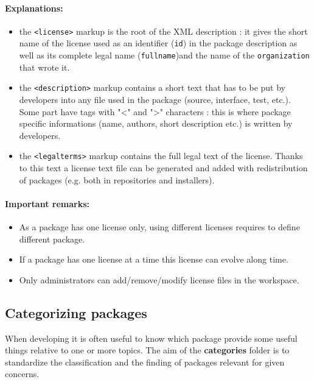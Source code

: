 \documentclass[12pt,a4paper]{article}
\begin{document}
\paragraph{Explanations:}
\begin{itemize}
\item the \texttt{<license>} markup is the root of the XML description : it gives the short name of the license used as an identifier (\texttt{id}) in the package description as well as its complete legal name (\texttt{fullname})and the name of the \texttt{organization} that wrote it.
\item the \texttt{<description>} markup contains a short text that has to be put by developers into any file used in the package (source, interface, test, etc.). Some part have tags with "<" and ">" characters : this is where package specific informations (name, authors, short description etc.) is written by developers.
\item the \texttt{<legalterms>} markup contains the full legal text of the license. Thanks to this text a license text file can be generated and added with redistribution of packages (e.g. both in repositories and installers).
\end{itemize}

\paragraph{Important remarks:} 
\begin{itemize}
\item As a package has one license only, using different licenses requires to define different package.
\item If a package has one license at a time this license can evolve along time.
\item Only administrators can add/remove/modify license files in the workspace.
\end{itemize}

\subsection{Categorizing packages}

When developing it is often useful to know which package provide some useful things relative to one or more topics. The aim of the \textbf{categories} folder is to standardize the classification and the finding of packages relevant for given concerns.
\end{document}
